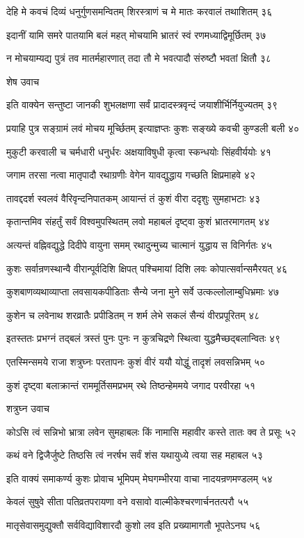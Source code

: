 देहि मे कवचं दिव्यं धनुर्गुणसमन्वितम्
शिरस्त्राणं च मे मातः करवालं तथाशितम् ३६

इदानीं यामि समरे पातयामि बलं महत्
मोचयामि भ्रातरं स्वं रणमध्याद्विमूर्छितम् ३७

न मोचयाम्यद्य पुत्रं तव मातर्महारणात्
तदा तौ मे भवत्पादौ संरुष्टौ भवतां क्षितौ ३८

शेष उवाच

इति वाक्येन सन्तुष्टा जानकी शुभलक्षणा
सर्वं प्रादादस्त्रवृन्दं जयाशीर्भिर्नियुज्यतम् ३९

प्रयाहि पुत्र सङ्ग्रामं लवं मोचय मूर्च्छितम्
इत्याज्ञप्तः कुशः सङ्ख्ये कवची कुण्डली बली ४०

मुकुटी करवाली च चर्मधारी धनुर्धरः
अक्षयाविषुधी कृत्वा स्कन्धयोः सिंहवीर्ययोः ४१

जगाम तरसा नत्वा मातृपादौ रथाग्रणीः
वेगेन यावद्युद्धाय गच्छति क्षिप्रमाहवे ४२

तावद्ददर्श स्वलवं वैरिवृन्दनिपातकम्
आयान्तं तं कुशं वीरा ददृशुः सुमहाभटाः ४३

कृतान्तमिव संहर्तुं सर्वं विश्वमुपस्थितम्
लवो महाबलं दृष्ट्वा कुशं भ्रातरमागतम् ४४

अत्यन्तं वह्निवद्युद्धे दिदीपे वायुना समम्
रथादुन्मुच्य चात्मानं युद्धाय स विनिर्गतः ४५

कुशः सर्वान्रणस्थान्वै वीरान्पूर्वदिशि क्षिपत्
पश्चिमायां दिशि लवः कोपात्सर्वान्समैरयत् ४६

कुशबाणव्यथाव्याप्ता लवसायकपीडिताः
सैन्ये जना मुने सर्वे उत्कल्लोलाम्बुधिभ्रमाः ४७

कुशेन च लवेनाथ शरव्रातैः प्रपीडितम्
न शर्म लेभे सकलं सैन्यं वीरप्रपूरितम् ४८

इतस्ततः प्रभग्नं तद्बलं त्रस्तं पुनः पुनः
न कुत्रचिद्रणे स्थित्वा युद्धमैच्छद्बलान्वितः ४९

एतस्मिन्समये राजा शत्रुघ्नः परतापनः
कुशं वीरं ययौ योद्धुं तादृशं लवसन्निभम् ५०

कुशं दृष्ट्वा बलाक्रान्तं राममूर्तिसमप्रभम्
रथे तिष्ठन्हेममये जगाद परवीरहा ५१

शत्रुघ्न उवाच

कोऽसि त्वं सन्निभो भ्रात्रा लवेन सुमहाबलः
किं नामासि महावीर कस्ते तातः क्व ते प्रसूः ५२

कथं वने द्विजैर्जुष्टे तिष्ठसि त्वं नरर्षभ
सर्वं शंस यथायुध्ये त्वया सह महाबल ५३

इति वाक्यं समाकर्ण्य कुशः प्रोवाच भूमिपम्
मेघगम्भीरया वाचा नादयन्रणमण्डलम् ५४

केवलं सुषुवे सीता पतिव्रतपरायणा
वने वसावो वाल्मीकेश्चरणार्चनतत्परौ ५५

मातृसेवासमुद्युक्तौ सर्वविद्याविशारदौ
कुशो लव इति प्रख्यामागतौ भूपतेऽनघ ५६

